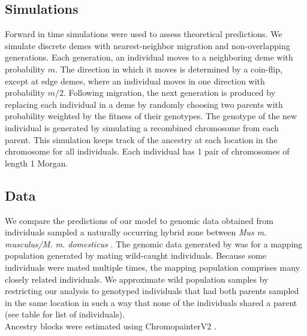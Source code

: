 \documentclass[12pt]{amsart}
\begin{document}


\subsection{}

\subsection{Simulations}
Forward in time simulations were used to assess theoretical predictions. We simulate discrete demes with nearest-neighbor migration and non-overlapping generations. Each generation, an individual moves to a neighboring deme with probability $m$. The direction in which it moves is determined by a coin-flip, except at edge demes, where an individual moves in one direction with probability $m/2$. Following migration, the next generation is produced by replacing each individual in a deme by randomly choosing two parents with probability weighted by the fitness of their genotypes. The genotype of the new individual is generated by simulating a recombined chromosome from each parent. This simulation keeps track of the ancestry at each location in the chromosome for all individuals. Each individual has 1 pair of chromosomes of length 1 Morgan. 

\subsection{Data}
We compare the predictions of our model to genomic data obtained from individuals sampled a naturally occurring hybrid zone between \emph{Mus m. musculus/M. m. domesticus} \cite{Turner2011,Turner2014}. The genomic data generated by \citep{Turner2014} was for a mapping population generated by mating wild-caught individuals. Because some individuals were mated multiple times, the mapping population comprises many closely related individuals. We approximate wild population samples by restricting our analysis to genotyped individuals that had both parents sampled in the same location in such a way that none of the individuals shared a parent (see table for list of individuals).\\

Ancestry blocks were estimated using ChromopainterV2 \cite{Lawson2012}. 
\end{document}
